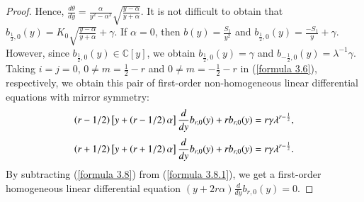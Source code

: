 \documentclass[12pt,reqno]{amsart}
\def\C{\mathbb{C}}
\numberwithin{equation}{section}
\begin{document}
\begin{proof}
Hence, 
$\frac{d\theta}{dy}=\frac{\alpha}{y^2-\alpha^2}\sqrt{\frac{y-\alpha}{y+\alpha}}$.
It is not difficult to obtain that $b_{\frac{1}{2},0}(y)=K_0\sqrt{\frac{y-\alpha}{y+\alpha}}+\gamma.$
 If $\alpha=0$, then $b(y)=\frac{S_1}{y^2}$ and $b_{\frac{1}{2},0}(y)=\frac{-S_1}{y}+\gamma.$
 However, since $b_{\frac{1}{2},0}(y)\in\C[y]$, we obtain $b_{\frac{1}{2},0}(y)=\gamma$ and $b_{-\frac{1}{2},0}(y)=\lambda^{-1}\gamma$. Taking $i=j=0$, $0\neq m=\frac{1}{2}-r$ and $0\neq m=-\frac{1}{2}-r$  in (\ref{formula 3.6}), respectively, we obtain this pair of first-order non-homogeneous linear differential equations with mirror symmetry: 
\begin{equation}\label{formula 3.8}
\aligned
\left(r-1/2\right)\left[y+\left(r-1/2\right)\alpha\right]\frac{d}{dy}b_{r,0}(y)+rb_{r,0}(y)=r\gamma\lambda^{r-\frac{1}{2}},
\endaligned
\end{equation}
\begin{equation}\label{formula 3.8.1}
\aligned
\left(r+1/2\right)\left[y+\left(r+1/2\right)\alpha\right]\frac{d}{dy}b_{r,0}(y)+rb_{r,0}(y)=r\gamma\lambda^{r-\frac{1}{2}}.
\endaligned
\end{equation}
By subtracting (\ref{formula 3.8}) from (\ref{formula 3.8.1}), we get a first-order homogeneous linear differential equation $(y+2r\alpha)\frac{d}{dy}b_{r,0}(y)=0.$

\end{proof}
\end{document}
